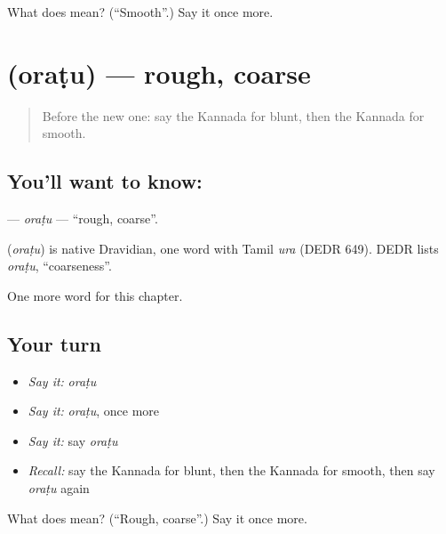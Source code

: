 \begin{tcolorbox}[breakable,colback=teal!4,colframe=teal!35!black,title={Before you move on}]
What does  mean? (\textquotedblleft{}Smooth\textquotedblright{}.) Say it once more.
\end{tcolorbox}
\section[\texorpdfstring{\kn{ಒರಟು} (oraṭu)}{ಒರಟು (oraṭu)}]{ (oraṭu) — rough, coarse}

\label{lesson:KA-C219-oratu}



\begin{quote}
Before the new one: say the Kannada for blunt, then the Kannada for smooth.
\end{quote}

\subsection*{You'll want to know: }
\textbf{} — \emph{oraṭu} — \textquotedblleft{}rough, coarse\textquotedblright{}.

\begin{cousinweb}
\textbf{} (\emph{oraṭu}) is native Dravidian, one word with Tamil \emph{ura} (DEDR 649). DEDR lists \emph{oraṭu}, \textquotedblleft{}coarseness\textquotedblright{}.
\end{cousinweb}

\begin{grammarlens}[title={What you've built}]
One more word for this chapter.
\end{grammarlens}

\subsection*{Your turn}
\begin{itemize}
\raggedright
  \item \emph{Say it:} \emph{oraṭu}
  \item \emph{Say it:} \emph{oraṭu}, once more
  \item \emph{Say it:} say \emph{oraṭu}
  \item \emph{Recall:} say the Kannada for blunt, then the Kannada for smooth, then say \emph{oraṭu} again
\end{itemize}

\begin{tcolorbox}[breakable,colback=teal!4,colframe=teal!35!black,title={Before you move on}]
What does  mean? (\textquotedblleft{}Rough, coarse\textquotedblright{}.) Say it once more.
\end{tcolorbox}
